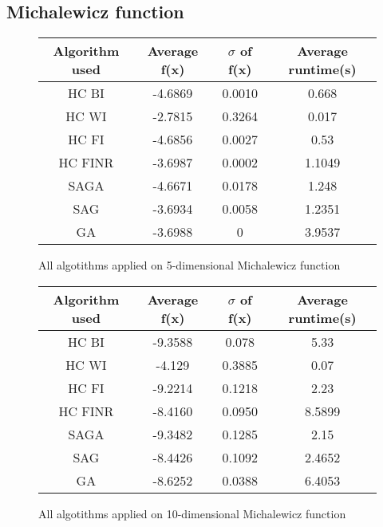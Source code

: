 \documentclass{article}
\begin{document}
\subsection{Michalewicz function}

\begin{figure}[H]
	\begin{tabular}{|c||c|c|c|} \hline
		Algorithm used & Average f(x) & $\sigma$ of f(x) & Average runtime(s) \\ \hline \hline
		HC BI & -4.6869 & 0.0010 & 0.668 \\ \hline
		HC WI & -2.7815 & 0.3264 & 0.017 \\ \hline
		HC FI & -4.6856 & 0.0027 & 0.53 \\ \hline
		HC FINR & -3.6987 & 0.0002 & 1.1049 \\ \hline
		SAGA & -4.6671 & 0.0178 & 1.248 \\ \hline
		SAG & -3.6934 & 0.0058 & 1.2351 \\ \hline
        GA & -3.6988 & 0 & 3.9537 \\ \hline
\end{tabular}
\caption{All algotithms applied on 5-dimensional Michalewicz function}
\end{figure}

\begin{figure}[H]
	\begin{tabular}{|c||c|c|c|} \hline
		Algorithm used & Average f(x) & $\sigma$ of f(x) & Average runtime(s) \\ \hline \hline
		HC BI & -9.3588 & 0.078 & 5.33 \\ \hline
		HC WI & -4.129 & 0.3885 & 0.07 \\ \hline
		HC FI & -9.2214 & 0.1218 & 2.23 \\ \hline
		HC FINR & -8.4160 & 0.0950 & 8.5899 \\ \hline
		SAGA & -9.3482 & 0.1285 & 2.15 \\ \hline
		SAG & -8.4426 & 0.1092 & 2.4652 \\ \hline
        GA & -8.6252 & 0.0388 & 6.4053 \\ \hline
\end{tabular}
\caption{All algotithms applied on 10-dimensional Michalewicz function}
\end{figure}
\end{document}
